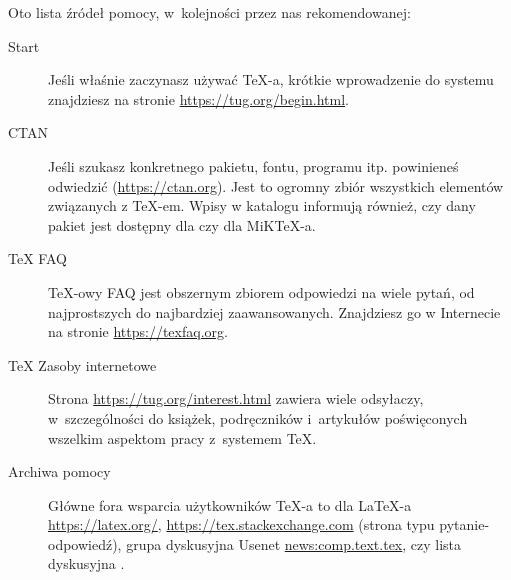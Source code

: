 \documentclass{article}
\begin{document}
Oto lista źródeł pomocy, w~kolejności przez nas rekomendowanej:
\begin{description}
\item [Start] Jeśli właśnie zaczynasz używać \TeX-a, krótkie wprowadzenie do systemu znajdziesz na stronie \url{https://tug.org/begin.html}.

\item [CTAN] Jeśli szukasz konkretnego pakietu, fontu, programu itp. powinieneś odwiedzić \CTAN{} (\url{https://ctan.org}). Jest to ogromny zbiór wszystkich elementów związanych z \TeX-em. Wpisy w katalogu informują również, czy dany pakiet jest dostępny dla \TL{}  czy dla  MiK\TeX-a. 


\item [\TeX{} FAQ] \TeX-owy FAQ jest obszernym zbiorem
odpowiedzi na wiele pytań, od najprostszych do najbardziej
zaawansowanych.  Znajdziesz go w Internecie na stronie \url{https://texfaq.org}.



\item [\TeX{} Zasoby internetowe] Strona \url{https://tug.org/interest.html}
zawiera wiele odsyłaczy, w~szczególności do książek, podręczników
i~artykułów poświęconych wszelkim aspektom pracy z~systemem \TeX.

\item [Archiwa pomocy] Główne fora wsparcia użytkowników \TeX-a to dla \LaTeX-a
\url{https://latex.org/},     %
 \url{https://tex.stackexchange.com} (strona typu pytanie-odpowiedź), grupa dyskusyjna Usenet \url{news:comp.text.tex}, czy
lista dyskusyjna .


\end{description}
\end{document}
